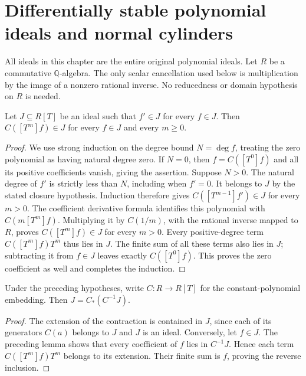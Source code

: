 \section{Differentially stable polynomial ideals and normal cylinders}

All ideals in this chapter are the entire original polynomial ideals. Let
$R$ be a commutative $\mathbb Q$-algebra. The only scalar cancellation used
below is multiplication by the image of a nonzero rational inverse. No
reducedness or domain hypothesis on $R$ is needed.

\begin{lemma}
\label{hir:differential-stable-polynomial-coefficients}
\leanok
Let $J\subseteq R[T]$ be an ideal such that $f'\in J$ for every $f\in J$.
Then $C([T^m]f)\in J$ for every $f\in J$ and every $m\geq0$.
\end{lemma}
\begin{proof}
We use strong induction on the degree bound $N=\deg f$, treating the zero
polynomial as having natural degree zero. If $N=0$, then $f=C([T^0]f)$
and all its positive coefficients vanish, giving the assertion.
Suppose $N>0$. The natural degree of $f'$ is strictly less than $N$,
including when $f'=0$. It belongs to $J$ by the stated closure hypothesis.
Induction therefore gives $C([T^{m-1}]f')\in J$ for every $m>0$.
The coefficient derivative formula identifies this polynomial with
$C(m[T^m]f)$. Multiplying it by $C(1/m)$, with the rational inverse
mapped to $R$, proves $C([T^m]f)\in J$ for every $m>0$.
Every positive-degree term $C([T^m]f)T^m$ thus lies in $J$.
The finite sum of all these terms also lies in $J$; subtracting it from
$f\in J$ leaves exactly $C([T^0]f)$. This proves the zero coefficient
as well and completes the induction.
\end{proof}

\begin{theorem}
\label{hir:differential-stable-polynomial-extension}
\leanok
Under the preceding hypotheses, write $C:R\longrightarrow R[T]$ for the
constant-polynomial embedding. Then $J=C_*(C^{-1}J)$.
\end{theorem}
\begin{proof}
The extension of the contraction is contained in $J$, since each of its
generators $C(a)$ belongs to $J$ and $J$ is an ideal. Conversely, let
$f\in J$. The preceding lemma shows that every coefficient of $f$ lies
in $C^{-1}J$. Hence each term $C([T^m]f)T^m$ belongs to its extension.
Their finite sum is $f$, proving the reverse inclusion.
\end{proof}

